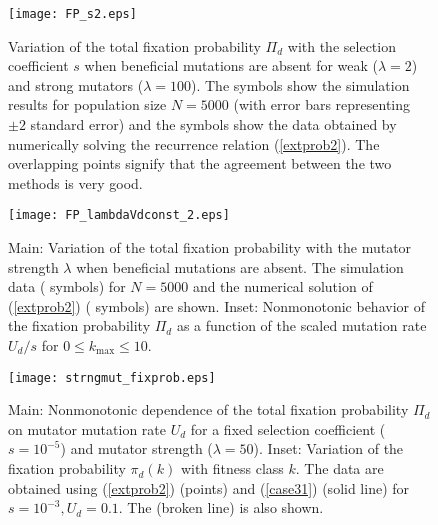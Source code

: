 \documentclass[preprint,12pt,number]{elsarticle}
\begin{document}
\begin{figure} 
\begin{center}  
\texttt{[image: FP\_s2.eps]}        
 \end{center}
\caption{Variation of the total fixation probability $\Pi_d$ with the selection coefficient  $s$ when beneficial mutations are absent for weak ($\lambda=2$) and strong mutators ($\lambda=100$). The  symbols show the simulation results for population size $N=5000$ (with  error bars representing $\pm 2$ standard error)  and the  symbols show the data obtained by numerically solving the recurrence relation (\ref{extprob2}). The overlapping points signify that the agreement between the two methods is very good.}
\label{fig_sdepn}
\end{figure}

\clearpage

\begin{figure} 
\begin{center}  
\texttt{[image: FP\_lambdaVdconst\_2.eps]}        
 \end{center}
\caption{Main: Variation of the total fixation probability with the mutator strength $\lambda$ when beneficial mutations are absent. The simulation data ( symbols) for $N=5000$ and the numerical solution of (\ref{extprob2}) ( symbols) are shown. Inset: Nonmonotonic behavior of the fixation probability $\Pi_d$ as a function of the scaled mutation rate $U_d/s$ for $0 \leq k_{\max} \leq 10$.}
\label{fig_lambda}
\end{figure}

\clearpage

\begin{figure} 
\begin{center}  
\texttt{[image: strngmut\_fixprob.eps]}
\end{center}
\caption{Main: Nonmonotonic dependence of the total fixation probability $\Pi_d$ on mutator mutation rate $U_d$ for a fixed selection coefficient ($s=10^{-5}$) and mutator strength ($\lambda=50$). Inset: Variation of the fixation probability $\pi_d(k)$ with fitness class $k$. The data are obtained using (\ref{extprob2}) (points) and (\ref{case31}) (solid line) for $s=10^{-3}, U_d=0.1$. The  {(broken line)} is also shown.}
\label{fig_Qkprobs}
\end{figure}
\end{document}
